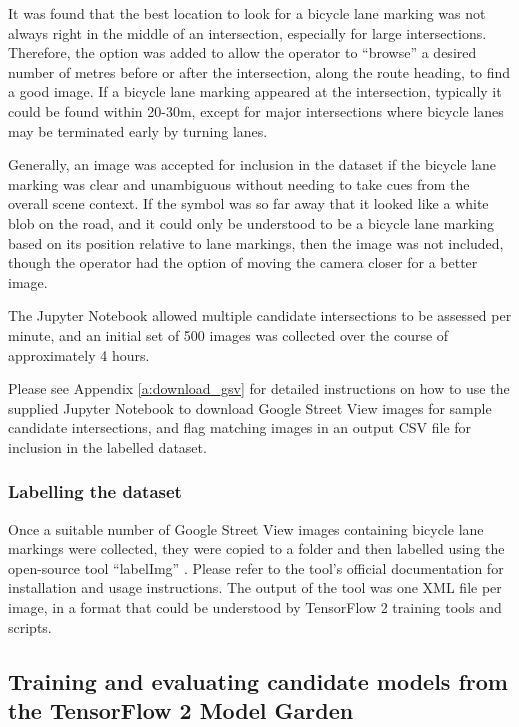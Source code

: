 \documentclass[11pt,twoside]{report}
\begin{document}
It was found that the best location to look for a bicycle lane marking was not always right in the middle of an intersection, especially for large intersections.  Therefore, the option was added to allow the operator to ``browse'' a desired number of metres before or after the intersection, along the route heading, to find a good image.  If a bicycle lane marking appeared at the intersection, typically it could be found within 20-30m, except for major intersections where bicycle lanes may be terminated early by turning lanes.

Generally, an image was accepted for inclusion in the dataset if the bicycle lane marking was clear and unambiguous without needing to take cues from the overall scene context.  If the symbol was so far away that it looked like a white blob on the road, and it could only be understood to be a bicycle lane marking based on its position relative to lane markings, then the image was not included, though the operator had the option of moving the camera closer for a better image.

The Jupyter Notebook allowed multiple candidate intersections to be assessed per minute, and an initial set of 500 images was collected over the course of approximately 4 hours.

Please see Appendix \ref{a:download_gsv} for detailed instructions on how to use the supplied Jupyter Notebook to download Google Street View images for sample candidate intersections, and flag matching images in an output CSV file for inclusion in the labelled dataset.


\subsubsection{Labelling the dataset}
\label{s:label}

Once a suitable number of Google Street View images containing bicycle lane markings were collected, they were copied to a folder and then labelled using the open-source tool ``labelImg'' \cite{labelImg}.  Please refer to the tool's official documentation for installation and usage instructions.  The output of the tool was one XML file per image, in a format that could be understood by TensorFlow 2 training tools and scripts.

\subsection{Training and evaluating candidate models from the TensorFlow 2 Model Garden}
\end{document}
